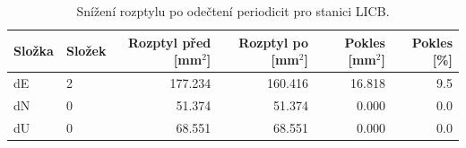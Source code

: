 \begin{table}[H]
\centering
\small
\caption{Snížení rozptylu po odečtení periodicit pro stanici LICB.}
\label{tab:gop25wd04_stcd_licb_detr_weighted_multiseg_spectral_lomb_scargle_variance_reduction}
\begin{tabular}{llrrrr}
\toprule
Složka & Složek & Rozptyl před [mm$^2$] & Rozptyl po [mm$^2$] & Pokles [mm$^2$] & Pokles [\%] \\
\midrule
dE & 2 & 177.234 & 160.416 & 16.818 & 9.5 \\
dN & 0 & 51.374 & 51.374 & 0.000 & 0.0 \\
dU & 0 & 68.551 & 68.551 & 0.000 & 0.0 \\
\bottomrule
\end{tabular}
\end{table}
